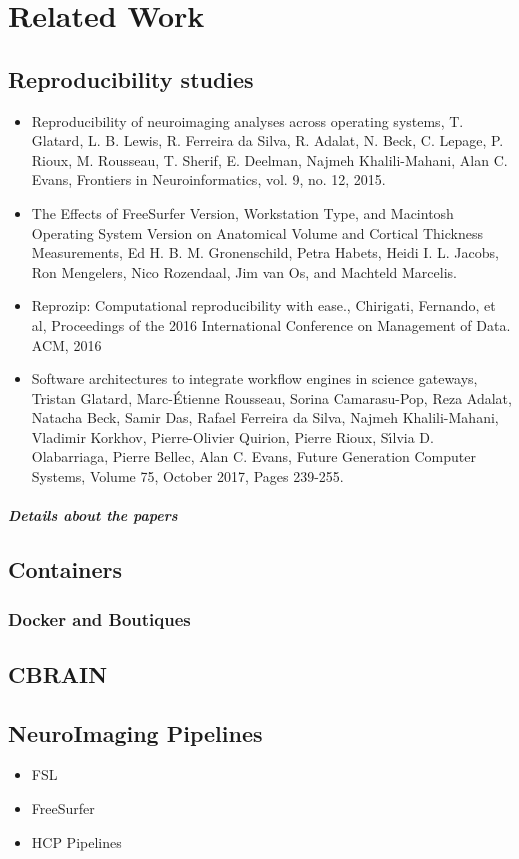 \chapter{Related Work}

\section{Reproducibility studies}
\begin{itemize}
 \item {Reproducibility of neuroimaging analyses across operating systems, T. Glatard, L. B. Lewis, R. Ferreira da Silva, R. Adalat, N. Beck, C. Lepage, P. Rioux, M. Rousseau, T. Sherif, E. Deelman, Najmeh Khalili-Mahani, Alan C. Evans, Frontiers in Neuroinformatics, vol. 9, no. 12, 2015.}
 \item {The Effects of FreeSurfer Version, Workstation Type, and Macintosh Operating System Version on Anatomical Volume and Cortical Thickness Measurements, Ed H. B. M. Gronenschild, Petra Habets, Heidi I. L. Jacobs, Ron Mengelers, Nico Rozendaal, Jim van Os, and Machteld Marcelis.}
 \item {Reprozip: Computational reproducibility with ease., Chirigati, Fernando, et al, Proceedings of the 2016 International Conference on Management of Data. ACM, 2016}
 \item {Software architectures to integrate workflow engines in science gateways, Tristan Glatard, Marc-Étienne Rousseau, Sorina Camarasu-Pop, Reza Adalat, Natacha Beck, Samir Das, Rafael Ferreira da Silva, Najmeh Khalili-Mahani, Vladimir Korkhov, Pierre-Olivier Quirion, Pierre Rioux, Sı́lvia D. Olabarriaga, Pierre Bellec, Alan C. Evans, Future Generation Computer Systems, Volume 75, October 2017, Pages 239-255.}
\end{itemize}
\paragraph{Details about the papers}

\section{Containers}
\subsection{Docker and Boutiques}

\section{CBRAIN}

\section{NeuroImaging Pipelines}

\begin{itemize}
 \item FSL
 \item FreeSurfer
 \item HCP Pipelines
\end{itemize}






